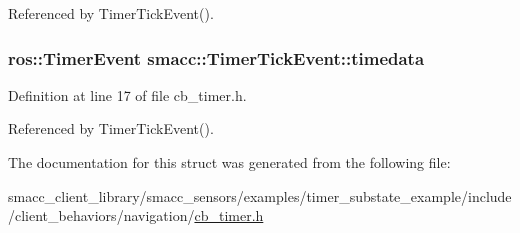 Referenced by Timer\+Tick\+Event().

\subsubsection[{\texorpdfstring{timedata}{timedata}}]{\setlength{\rightskip}{0pt plus 5cm}ros\+::\+Timer\+Event smacc\+::\+Timer\+Tick\+Event\+::timedata}\hypertarget{structsmacc_1_1TimerTickEvent_afac83d8b00999b26c2365932030389e9}{}\label{structsmacc_1_1TimerTickEvent_afac83d8b00999b26c2365932030389e9}


Definition at line 17 of file cb\+\_\+timer.\+h.



Referenced by Timer\+Tick\+Event().



The documentation for this struct was generated from the following file\+:\begin{DoxyCompactItemize}
\item 
smacc\+\_\+client\+\_\+library/smacc\+\_\+sensors/examples/timer\+\_\+substate\+\_\+example/include/client\+\_\+behaviors/navigation/\hyperlink{smacc__sensors_2examples_2timer__substate__example_2include_2client__behaviors_2navigation_2cb__timer_8h}{cb\+\_\+timer.\+h}\end{DoxyCompactItemize}
